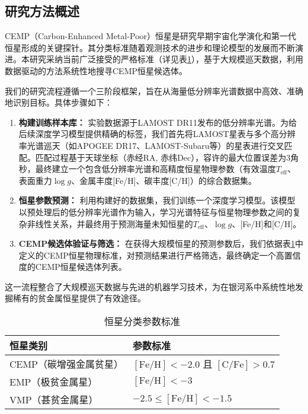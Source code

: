\subsection{研究方法概述}
CEMP（Carbon-Enhanced Metal-Poor）恒星是研究早期宇宙化学演化和第一代恒星形成的关键探针。其分类标准随着观测技术的进步和理论模型的发展而不断演进\cite{beers1992, aoki2007, norris2013}。本研究采纳当前广泛接受的严格标准（详见表\ref{tab:star_criteria}），基于大规模巡天数据，利用数据驱动的方法系统性地搜寻CEMP恒星候选体。

我们的研究流程遵循一个三阶段框架，旨在从海量低分辨率光谱数据中高效、准确地识别目标。具体步骤如下：
\begin{enumerate}
    \item \textbf{构建训练样本库：} 实验数据源于LAMOST DR11发布的低分辨率光谱。为给后续深度学习模型提供精确的标签，我们首先将LAMOST星表与多个高分辨率光谱巡天（如APOGEE DR17、LAMOST-Subaru等）的星表进行交叉匹配。匹配过程基于天球坐标（赤经RA, 赤纬Dec），容许的最大位置误差为3角秒，最终建立一个包含低分辨率光谱和高精度恒星物理参数（有效温度$T_{\text{eff}}$、表面重力$\log g$、金属丰度[Fe/H]、碳丰度[C/H]）的综合数据集。
    \item \textbf{恒星参数预测：} 利用构建好的数据集，我们训练一个深度学习模型。该模型以预处理后的低分辨率光谱作为输入，学习光谱特征与恒星物理参数之间的复杂非线性关系，并最终用于预测海量未知恒星的$T_{\text{eff}}$、$\log g$、[Fe/H]和[C/H]。
    \item \textbf{CEMP候选体验证与筛选：} 在获得大规模恒星的预测参数后，我们依据表\ref{tab:star_criteria}中定义的CEMP恒星物理标准，对预测结果进行严格筛选，最终确定一个高置信度的CEMP恒星候选体列表。
\end{enumerate}


这一流程整合了大规模巡天数据与先进的机器学习技术，为在银河系中系统性地发掘稀有的贫金属恒星提供了有效途径。



\begin{table}[htbp]
    \centering
    \caption{恒星分类参数标准}

    
    \label{tab:star_criteria}
    \begin{tabular}{|l|l|}
    \hline
    \textbf{恒星类别} & \textbf{参数标准} \\
    \hline
    CEMP（碳增强金属贫星） & $[\mathrm{Fe}/\mathrm{H}] < -2.0$ 且 $[\mathrm{C}/\mathrm{Fe}] > 0.7$ \\
    \hline
    EMP（极贫金属星） & $[\mathrm{Fe}/\mathrm{H}] < -3$ \\
    \hline
    VMP（甚贫金属星） & $-2.5 \le [\mathrm{Fe}/\mathrm{H}] < -1.5$ \\
    \hline
    \end{tabular}
\end{table}

